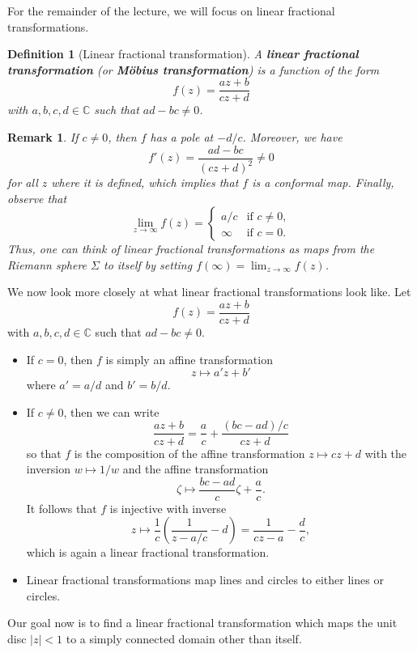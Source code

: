 \documentclass[10pt]{article}
\newcommand{\C}{\mathbb{C}}
\theoremstyle{newstyle}
\newtheorem{remark}[thm]{Remark}
\newtheorem{defn}[thm]{Definition}
\begin{document}
For the remainder of the lecture, we will focus on linear fractional transformations. 

\begin{defn}[Linear fractional transformation]
A {\bf linear fractional transformation} (or {\bf M\"obius transformation}) is a function of the form 
\[ f(z) = \frac{az + b}{cz + d} \]
with $a, b, c, d \in \C$ such that $ad - bc \neq 0$. 
\end{defn}

\begin{remark}
If $c \neq 0$, then $f$ has a pole at $-d/c$. Moreover, we have 
\[ f'(z) = \frac{ad - bc}{(cz + d)^2} \neq 0 \] 
for all $z$ where it is defined, which implies that $f$ is a conformal map. Finally, observe that 
\[ \lim_{z\to\infty} f(z) = \begin{cases} a/c & \text{if } c \neq 0, \\ \infty & \text{if } c = 0. \end{cases} \] 
Thus, one can think of linear fractional transformations as maps from the Riemann sphere 
$\Sigma$ to itself by setting $f(\infty) = \lim_{z\to\infty} f(z)$. 
\end{remark}

We now look more closely at what linear fractional transformations look like. Let 
\[ f(z) = \frac{az + b}{cz + d} \]
with $a, b, c, d \in \C$ such that $ad - bc \neq 0$. 
\begin{itemize}
    \item If $c = 0$, then $f$ is simply an affine transformation 
    \[ z \mapsto a'z + b' \]
    where $a' = a/d$ and $b' = b/d$. 
    \item If $c \neq 0$, then we can write 
    \[ \frac{az + b}{cz + d} = \frac{a}{c} + \frac{(bc-ad)/c}{cz + d} \]
    so that $f$ is the composition of the affine transformation $z \mapsto cz+d$ with the 
    inversion $w \mapsto 1/w$ and the affine transformation 
    \[ \zeta \mapsto \frac{bc-ad}c \zeta + \frac ac. \]
    It follows that $f$ is injective with inverse 
    \[ z \mapsto \frac1c \left( \frac1{z-a/c} - d \right) = \frac{1}{cz-a} - \frac dc, \]
    which is again a linear fractional transformation. 
    \item Linear fractional transformations map lines and circles to either lines or circles. 
\end{itemize}

Our goal now is to find a linear fractional transformation which maps the unit disc $|z| < 1$ to a simply 
connected domain other than itself. 
\end{document}
